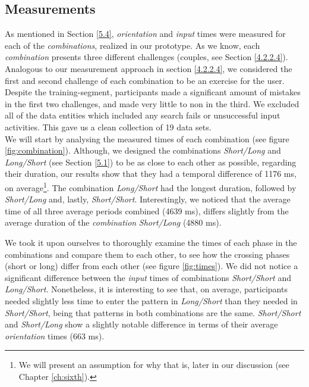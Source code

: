 \subsection{Measurements}

 As mentioned in Section \ref{5.4}, \textit{orientation} and \textit{input} times were measured for each of the \textit{combinations}, realized in our prototype. As we know, each \textit{combination} presents three different challenges (couples, see Section \ref{4.2.2.4}). Analogous to our measurement approach in section \ref{4.2.2.4}, we considered the first and second challenge of each combination to be an exercise for the user. Despite the training-segment, participants made a significant amount of mistakes in the first two challenges, and made very little to non in the third. We excluded all of the data entities which included any search fails or unsuccessful input activities. This gave us a clean collection of 19 data sets. \\

We will start by analysing the measured times of each combination (see figure \ref{fig:combination}). Although, we designed the combinations \textit{Short/Long} and \textit{Long/Short} (see Section \ref{5.1}) to be as close to each other as possible, regarding their duration, our results show that they had a temporal difference of 1176 ms, on average\footnote{We will present an assumption for why that is, later in our discussion (see Chapter \ref{ch:sixth}).}. The combination \textit{Long/Short} had the longest duration, followed by \textit{Short/Long} and, lastly, \textit{Short/Short}.  Interestingly, we noticed that the average time of all three average periods combined (4639 ms), differs slightly from the average duration of the \textit{combination} \textit{Short/Long} (4880 ms). 

We took it upon ourselves to thoroughly examine the times of each phase in the combinations and compare them to each other, to see how the crossing phases (short or long) differ from each other (see figure \ref{fig:times}). We did not notice a significant difference between the \textit{input} times of combinations \textit{Short/Short} and \textit{Long/Short}. Nonetheless, it is interesting to see that, on average, participants needed slightly less time to enter the pattern in \textit{Long/Short} than they needed in \textit{Short/Short}, being that patterns in both combinations are the same. \textit{Short/Short} and \textit{Short/Long} show a slightly notable difference in terms of their average \textit{orientation} times (663 ms). 

